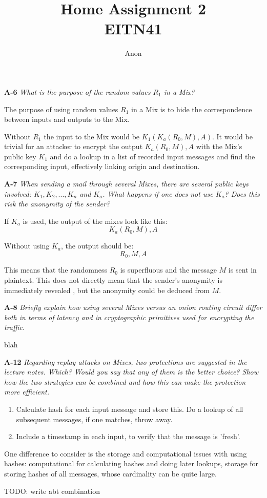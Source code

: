 \documentclass[a4paper]{article}
\title{Home Assignment 2 \\ EITN41}
\author{Anon}
\date{}
\newcommand{\Q}[2]{ \vspace{10pt} \textbf{#1} \textit{#2} }
\newcommand{\A}[1]{ #1 }
\begin{document}
\maketitle

\Q{A-6} { %
  What is the purpose of the random values $R_1$ in a Mix?
}

\A{
  The purpose of using random values $R_1$ in a Mix is
  to hide the correspondence between inputs and outputs to the Mix.

  Without $R_1$ the input to the Mix would be
  $K_1(K_a(R_0,M),A)$. It would be trivial for an attacker to encrypt
  the output $K_a(R_0,M),A$ with the Mix's public key $K_1$
  and do a lookup in a list of recorded input messages 
  and find the corresponding input, effectively linking
  origin and destination.
}

\Q{A-7} { %
  When sending a mail through several Mixes, there are several public keys 
  involved: $K_1,K_2, . . . ,K_n$ and $K_a$. 
  What happens if one does not use $K_a$? 
  Does this risk the anonymity of the sender?
}

\A{
  If $K_a$ is used, the output of the mixes look like this:
  \begin{displaymath}
    K_a(R_0,M),A
  \end{displaymath}

  Without using $K_a$, the output should be:
  \begin{displaymath}
    R_0,M,A
  \end{displaymath}

  This means that the randomness $R_0$ is superfluous 
  and the message $M$ is sent in plaintext. This does not
  directly mean that the sender's anonymity is immediately revealed
  , but the anonymity could be deduced from $M$.
}

\Q{A-8} {
 Briefly explain how using several Mixes versus an onion routing 
 circuit differ both in terms of latency and in cryptographic 
 primitives used for encrypting the traffic. 
}

\A{
  blah
}

\Q{A-12} {
  Regarding replay attacks on Mixes, two protections are suggested in the lecture notes. 
  Which? Would you say that any of them is the better choice?
  Show how the two strategies can be combined and how this
  can make the protection more efficient.
}

\A{
  \begin{enumerate}
    \item Calculate hash for each input message and store this.
    Do a lookup of all subsequent messages, if one matches, 
    throw away.
    \item Include a timestamp in each input, to verify that 
    the message is 'fresh'.
  \end{enumerate}

  One difference to consider is the storage and computational
  issues with using hashes: computational for calculating
  hashes and doing later lookups, storage for storing hashes of
  all messages, whose cardinality can be quite large.

  TODO: write abt combination
}
\end{document}
